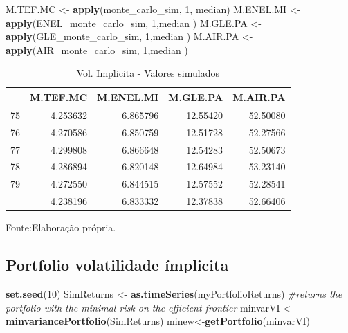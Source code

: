 \documentclass[
  12pt,
  a4paper,
  openany]{book}
\newenvironment{Shaded}{\begin{snugshade}}{\end{snugshade}}
\newcommand{\CommentTok}[1]{\textcolor[rgb]{0.56,0.35,0.01}{\textit{#1}}}
\newcommand{\DecValTok}[1]{\textcolor[rgb]{0.00,0.00,0.81}{#1}}
\newcommand{\KeywordTok}[1]{\textcolor[rgb]{0.13,0.29,0.53}{\textbf{#1}}}
\newcommand{\NormalTok}[1]{#1}
\newcommand{\StringTok}[1]{\textcolor[rgb]{0.31,0.60,0.02}{#1}}
\begin{document}
\scriptsize

\begin{Shaded}
\begin{Highlighting}[]
\NormalTok{M.TEF.MC \textless{}{-}}\StringTok{ }\KeywordTok{apply}\NormalTok{(monte\_carlo\_sim, }\DecValTok{1}\NormalTok{, median)}
\NormalTok{M.ENEL.MI \textless{}{-}}\StringTok{ }\KeywordTok{apply}\NormalTok{(ENEL\_monte\_carlo\_sim, }\DecValTok{1}\NormalTok{,median )}
\NormalTok{M.GLE.PA \textless{}{-}}\StringTok{ }\KeywordTok{apply}\NormalTok{(GLE\_monte\_carlo\_sim, }\DecValTok{1}\NormalTok{,median )}
\NormalTok{M.AIR.PA \textless{}{-}}\StringTok{ }\KeywordTok{apply}\NormalTok{(AIR\_monte\_carlo\_sim, }\DecValTok{1}\NormalTok{,median )}
\end{Highlighting}
\end{Shaded}

\normalsize
\begin{table}[!h]

\caption{\label{tab:unnamed-chunk-55}Vol. Implicita - Valores simulados}
\centering
\begin{tabular}[t]{lrrrr}
\toprule
  & M.TEF.MC & M.ENEL.MI & M.GLE.PA & M.AIR.PA\\
\midrule
75 & 4.253632 & 6.865796 & 12.55420 & 52.50080\\
76 & 4.270586 & 6.850759 & 12.51728 & 52.27566\\
77 & 4.299808 & 6.866648 & 12.54283 & 52.50673\\
78 & 4.286894 & 6.820148 & 12.64984 & 53.23140\\
79 & 4.272550 & 6.844515 & 12.57552 & 52.28541\\
\addlinespace
80 & 4.238196 & 6.833332 & 12.37838 & 52.66406\\
\bottomrule
\end{tabular}
\end{table}
\FloatBarrier
\centering

Fonte:Elaboração própria.

\justifying
\bigskip

\hypertarget{portfolio-volatilidade-uxedmplicita}{%
\subsection{Portfolio volatilidade ímplicita}\label{portfolio-volatilidade-uxedmplicita}}

\scriptsize

\begin{Shaded}
\begin{Highlighting}[]
\KeywordTok{set.seed}\NormalTok{(}\DecValTok{10}\NormalTok{)}
\NormalTok{SimReturns \textless{}{-}}\StringTok{ }\KeywordTok{as.timeSeries}\NormalTok{(myPortfolioReturns)}
\CommentTok{\#returns the portfolio with the minimal risk on the efficient frontier}
\NormalTok{minvarVI \textless{}{-}}\StringTok{ }\KeywordTok{minvariancePortfolio}\NormalTok{(SimReturns) }
\NormalTok{minew\textless{}{-}}\KeywordTok{getPortfolio}\NormalTok{(minvarVI)}
\end{Highlighting}
\end{Shaded}
\end{document}
